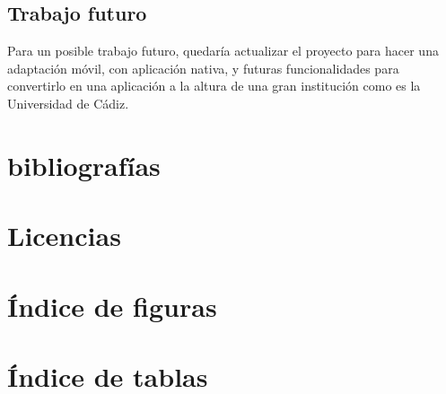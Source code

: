 \documentclass[12pt,letterpaper]{report}
\begin{document}
	\subsection{Trabajo futuro}
		Para un posible trabajo futuro, quedaría actualizar el proyecto para hacer una adaptación móvil,
		con aplicación nativa, y futuras funcionalidades para convertirlo en una aplicación a la altura
		de una gran institución como es la Universidad de Cádiz.
\section{bibliografías}

\section{Licencias}

\section{Índice de figuras}

\section{Índice de tablas}
\end{document}
